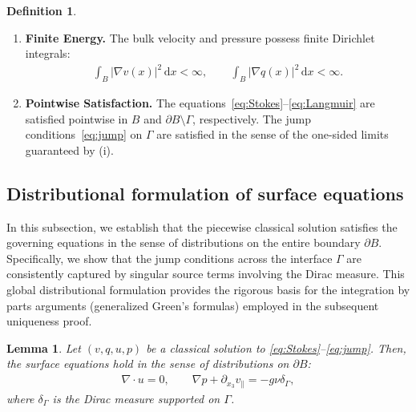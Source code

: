 \documentclass{article}
\newtheorem{lemma}[theorem]{Lemma}
\theoremstyle{remark}
\theoremstyle{definition}
\newtheorem{definition}[theorem]{Definition}
\numberwithin{equation}{section}
\begin{document}
\begin{definition}
\begin{enumerate}
        \item \textbf{Finite Energy.} The bulk velocity and pressure possess finite Dirichlet integrals:
        \begin{align*}
            \int_B|\nabla v(x)|^2\,\mathrm{d}x<\infty,\qquad
            \int_B|\nabla q(x)|^2\,\mathrm{d}x<\infty.
        \end{align*}
        
        \item \textbf{Pointwise Satisfaction.} The equations~\eqref{eq:Stokes}--\eqref{eq:Langmuir} are satisfied pointwise in $B$ and $\partial B\setminus\Gamma$, respectively.
        The jump conditions~\eqref{eq:jump} on $\Gamma$ are satisfied in the sense of the one-sided limits guaranteed by (i).
    \end{enumerate}
\end{definition}


\subsection{Distributional formulation of surface equations}

In this subsection, we establish that the piecewise classical solution satisfies the governing equations in the sense of distributions on the entire boundary $\partial B$. Specifically, we show that the jump conditions across the interface $\Gamma$ are consistently captured by singular source terms involving the Dirac measure. This global distributional formulation provides the rigorous basis for the integration by parts arguments (generalized Green's formulas) employed in the subsequent uniqueness proof.

\begin{lemma}
    \label{lem:distributional}
    Let $(v,q,u,p)$ be a classical solution to \eqref{eq:Stokes}--\eqref{eq:jump}. Then, the surface equations hold in the sense of distributions on $\partial B$:
    \begin{align*}
        \nabla\cdot u = 0,\qquad
        \nabla p+\partial_{x_3}v_\parallel = -g\nu\delta_\Gamma,
    \end{align*}
    where $\delta_\Gamma$ is the Dirac measure supported on $\Gamma$.
\end{lemma}
\end{document}
